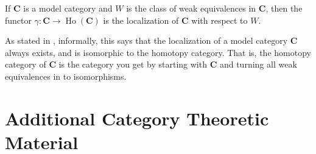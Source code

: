 \documentclass{amsart}
\theoremstyle{definition} \newaliasedtheorem{defn}[thm]{Definition}
\theoremstyle{definition} \newtheorem*{defn*}{Definition}
\theoremstyle{definition} \newaliasedtheorem{xca}[thm]{Exercise}
\theoremstyle{definition} \newtheorem*{soln*}{Solution}
\theoremstyle{definition} \newaliasedtheorem{remark}[thm]{Remark}
\theoremstyle{definition} \newtheorem*{remark*}{Remark}
\newcommand{\cat}[1]{\ensuremath{\mathbf{#1}}}
\DeclareMathOperator{\Ho}{Ho}
\begin{document}
  
  \begin{thm}
    If \cat{C} is a model category and $W$ is the class of weak equivalences in \cat{C}, then the functor $\gamma : \cat{C} \to \Ho(\cat{C})$ is the localization of \cat{C} with respect to $W$.
  \end{thm}
  
  As stated in \cite{dwyer1995homotopy}, informally, this says that the localization of a model category \cat{C} always exists, and is isomorphic to the homotopy category.  That is, the homotopy category of \cat{C} is the category you get by starting with \cat{C} and turning all weak equivalences in to isomorphisms.
  

 



\clearpage

\appendix
\section{Additional Category Theoretic Material}
\end{document}

